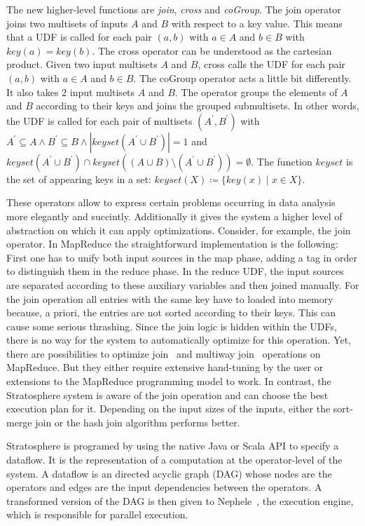 The new higher-level functions are \emph{join}, \emph{cross} and \emph{coGroup}.
The join operator joins two multisets of inputs $A$ and $B$ with respect to a key value.
This means that a UDF is called for each pair $(a,b)$ with $a\in A$ and $b\in B$ with $key(a)=key(b)$.
The cross operator can be understood as the cartesian product.
Given two input multisets $A$ and $B$, cross calls the UDF for each pair $(a,b)$ with $a\in A$ and $b\in B$.
The coGroup operator acts a little bit differently.
It also takes 2 input multisets $A$ and $B$.
The operator groups the elements of $A$ and $B$ according to their keys and joins the grouped submultisets.
In other words, the UDF is called for each pair of multisets $(A^\prime, B^\prime)$ with $A^\prime \subseteq A \wedge B^\prime \subseteq B \wedge |keyset(A^\prime \cup B^\prime)| = 1$ and $keyset(A^\prime \cup B^\prime) \cap keyset((A \cup B) \setminus (A^\prime \cup B^\prime)) = \emptyset$.
The function $keyset$ is the set of appearing keys in a set: $keyset(X) \coloneqq \{ key(x) \mid x \in X \}$.

These operators allow to express certain problems occurring in data analysis more elegantly and succintly.
Additionally it gives the system a higher level of abstraction on which it can apply optimizations.
Consider, for example, the join operator.
In MapReduce the straightforward implementation is the following:
First one has to unify both input sources in the map phase, adding a tag in order to distinguish them in the reduce phase.
In the reduce UDF, the input sources are separated according to these auxiliary variables and then joined manually.
For the join operation all entries with the same key have to loaded into memory because, a priori, the entries are not sorted according to their keys.
This can cause some serious thrashing.
Since the join logic is hidden within the UDFs, there is no way for the system to automatically optimize for this operation.
Yet, there are possibilities to optimize join~\cite{blanas:2010a} and multiway join~\cite{afrati:2010a} operations on MapReduce.
But they either require extensive hand-tuning by the user or extensions to the MapReduce programming model to work.
In contrast, the Stratosphere system is aware of the join operation and can choose the best execution plan for it.
Depending on the input sizes of the inputs, either the sort-merge join or the hash join algorithm performs better.

Stratosphere is programed by using the native Java or Scala API to specify a dataflow.
It is the representation of a computation at the operator-level of the system.
A dataflow is an directed acyclic graph (DAG) whose nodes are the operators and edges are the input dependencies between the operators.
A transformed version of the DAG is then given to Nephele~\cite{warneke:2009a}, the execution engine, which is responsible for parallel execution.


